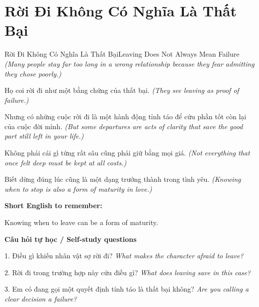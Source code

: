 \section{Rời Đi Không Có Nghĩa Là Thất Bại}
\begin{truyen}{Rời Đi Không Có Nghĩa Là Thất Bại}{Leaving Does Not Always Mean Failure}
\textit{(Many people stay far too long in a wrong relationship because they fear admitting they chose poorly.)}

Họ coi rời đi như một bằng chứng của thất bại.
\textit{(They see leaving as proof of failure.)}

Nhưng có những cuộc rời đi là một hành động tỉnh táo để cứu phần tốt còn lại của cuộc đời mình.
\textit{(But some departures are acts of clarity that save the good part still left in your life.)}

Không phải cái gì từng rất sâu cũng phải giữ bằng mọi giá.
\textit{(Not everything that once felt deep must be kept at all costs.)}

\end{truyen}

\begin{baihoc}
Biết dừng đúng lúc cũng là một dạng trưởng thành trong tình yêu.
\textit{(Knowing when to stop is also a form of maturity in love.)}
\end{baihoc}

\begin{ghinhoanh}
\textbf{Short English to remember:}

Knowing when to leave can be a form of maturity.

\end{ghinhoanh}

\begin{tuhocnhanh}
\textbf{Câu hỏi tự học / Self-study questions}

1. Điều gì khiến nhân vật sợ rời đi? \textit{What makes the character afraid to leave?}

2. Rời đi trong trường hợp này cứu điều gì? \textit{What does leaving save in this case?}

3. Em có đang gọi một quyết định tỉnh táo là thất bại không? \textit{Are you calling a clear decision a failure?}
\end{tuhocnhanh}

